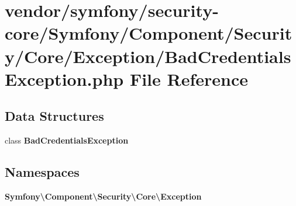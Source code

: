 \section{vendor/symfony/security-\/core/\+Symfony/\+Component/\+Security/\+Core/\+Exception/\+Bad\+Credentials\+Exception.php File Reference}
\label{_bad_credentials_exception_8php}
\subsection*{Data Structures}
\begin{DoxyCompactItemize}
\item 
class {\bf Bad\+Credentials\+Exception}
\end{DoxyCompactItemize}
\subsection*{Namespaces}
\begin{DoxyCompactItemize}
\item 
 {\bf Symfony\textbackslash{}\+Component\textbackslash{}\+Security\textbackslash{}\+Core\textbackslash{}\+Exception}
\end{DoxyCompactItemize}
